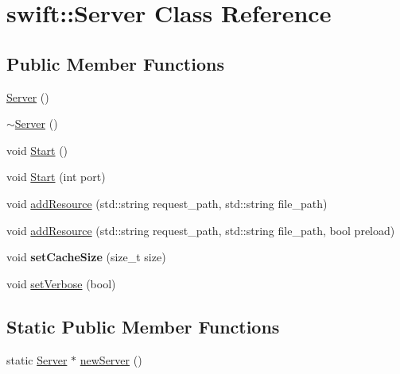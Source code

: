 \hypertarget{classswift_1_1_server}{\section{swift\-:\-:Server Class Reference}
\label{classswift_1_1_server}
}
\subsection*{Public Member Functions}
\begin{DoxyCompactItemize}
\item 
\hyperlink{classswift_1_1_server_a0322af4ef5852cd53e37dc661c46637b}{Server} ()
\item 
\hyperlink{classswift_1_1_server_aef7faff951fc4b6f82450fd93f7c06c5}{$\sim$\-Server} ()
\item 
void \hyperlink{classswift_1_1_server_aff8c9f94b8d827131b0b80b6607ea01f}{Start} ()
\item 
void \hyperlink{classswift_1_1_server_a9778a55fbf0118a856af782d21562019}{Start} (int port)
\item 
void \hyperlink{classswift_1_1_server_ae4354d31df0a668c8de089da2faf1ab2}{add\-Resource} (std\-::string request\-\_\-path, std\-::string file\-\_\-path)
\item 
void \hyperlink{classswift_1_1_server_ac07ca21b3203f486ae6372d7accfabce}{add\-Resource} (std\-::string request\-\_\-path, std\-::string file\-\_\-path, bool preload)
\item 
\hypertarget{classswift_1_1_server_ad94cc232553cbbddb57463c343456e18}{void {\bfseries set\-Cache\-Size} (size\-\_\-t size)}\label{classswift_1_1_server_ad94cc232553cbbddb57463c343456e18}

\item 
void \hyperlink{classswift_1_1_server_a689cb1da20caa7c8a5ac733a4259f87b}{set\-Verbose} (bool)
\end{DoxyCompactItemize}
\subsection*{Static Public Member Functions}
\begin{DoxyCompactItemize}
\item 
static \hyperlink{classswift_1_1_server}{Server} $\ast$ \hyperlink{classswift_1_1_server_a305f7482f2229d522a08f1d92b36dea2}{new\-Server} ()
\end{DoxyCompactItemize}


